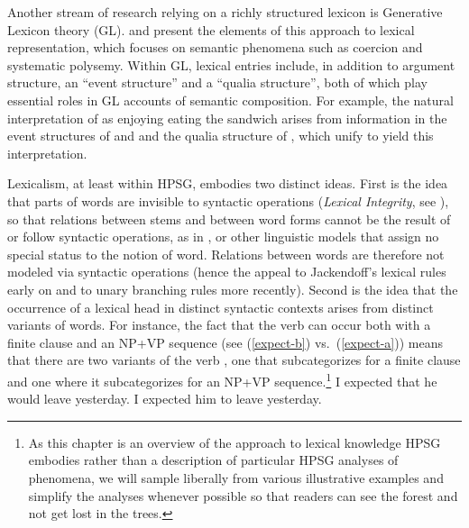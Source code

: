 \documentclass[output=paper,biblatex,babelshorthands,newtxmath,draftmode,colorlinks,citecolor=brown]{langscibook}
\begin{document}
Another stream of research relying on a richly structured lexicon is Generative Lexicon theory (GL).
\citet{Pustejovsky1991,Pustejovsky1995} and \citet{PustejovskyandJezek1996} present the elements of
this approach to lexical representation, which focuses on semantic phenomena such as coercion and
systematic polysemy. 
Within GL, lexical entries include, in addition to argument structure, an ``event structure'' and a
``qualia structure'', both of which play essential roles in GL accounts of semantic composition. 
For example, the natural interpretation of  as enjoying eating the sandwich
arises from information in the event structures of  and  and the qualia
structure of , which unify to yield this interpretation. 

Lexicalism, at least within HPSG, embodies two distinct ideas. First is the idea that parts of words
are invisible to syntactic operations (\emph{Lexical Integrity}, see
\citealt{BresnanandMchombo1995}), so that relations between stems and between word forms cannot be
the result of or follow syntactic operations, as in 
\citep{HalleandMarantz1993}, or other linguistic models that assign no special status to the notion
of word. Relations between words are therefore not modeled via syntactic operations (hence the
appeal to Jackendoff's lexical rules early on and to unary branching rules more recently). 
Second is the idea that the occurrence of a lexical head
in distinct syntactic contexts arises from distinct variants of words. For instance, the fact that
the verb  can occur both with a finite clause and an NP+VP sequence (see
(\ref{expect-b}) vs.\ (\ref{expect-a})) means that there are two variants of the verb ,
one that subcategorizes for a finite clause and one where it subcategorizes for an NP+VP
sequence.\footnote{As this chapter is an overview of the approach to lexical knowledge HPSG embodies
  rather than a description of particular HPSG analyses of phenomena, we will sample liberally from
  various illustrative examples and simplify the analyses whenever possible so that readers can see
  the forest and not get lost in the trees.} 
\eal
\ex \label{expect-b} I expected that he would leave yesterday.
\ex \label{expect-a} I expected him to leave yesterday.
\zl
\end{document}
